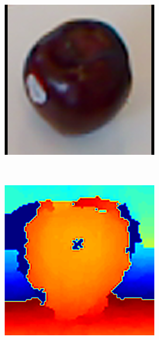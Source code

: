 \begin{figure}
\begin{subfigure}[b]{0.3\linewidth}
    	\caption{}
	\end{subfigure}
    \begin{subfigure}[b]{0.3\linewidth}
	    \includegraphics[width=\textwidth]{images/apple_1_4_1_crop.png}
    	\caption{}
	\end{subfigure}
    \\
    \begin{subfigure}[b]{0.3\linewidth}
	    \includegraphics[width=\textwidth]{images/apple_1_1_1_depthcrop.png}

\end{subfigure}
\end{figure}
